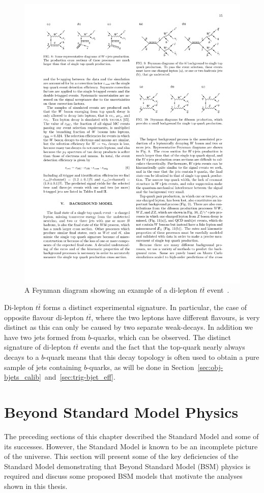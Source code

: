 \begin{figure}[!hbt]
  \begin{center}
    \includegraphics[width=0.47\linewidth, angle=0]{figs/Theory/ttbar.pdf}
  \end{center}
  \vspace{-1em}
  \caption[A Feynman diagram showing an example of a di-lepton $t\bar{t}$ event.]
          {A Feynman diagram showing an example of a di-lepton $t\bar{t}$ event~\cite{theo-ttbar_feyn}.}
          \label{fig:theo-ttbar}
  \vspace{-1em}
\end{figure}

Di-lepton $t\bar{t}$ forms a distinct experimental signature.
In particular, the case of opposite flavour di-lepton $t\bar{t}$, where the two leptons have different flavours, is very distinct
as this can only be caused by two separate weak-decays.
In addition we have two jets formed from $b$-quarks, which can be observed.
The distinct signature of di-lepton $t\bar{t}$ events and the fact that the top-quark nearly always decays to a $b$-quark
means that this decay topology is often used to obtain a pure sample of jets containing $b$-quarks,
as will be done in Section~\ref{sec:obj-bjets_calib}~and~\ref{sec:trig-bjet_eff}.

\section{Beyond Standard Model Physics}
\label{sec:theo-bsm}

The preceding sections of this chapter described the Standard Model and some of its successes.
However, the Standard Model is known to be an incomplete picture of the universe.
This section will present some of the key deficiencies of the Standard Model demonstrating that Beyond Standard Model (BSM) physics is required
and discuss some proposed BSM models that motivate the analyses shown in this thesis.

